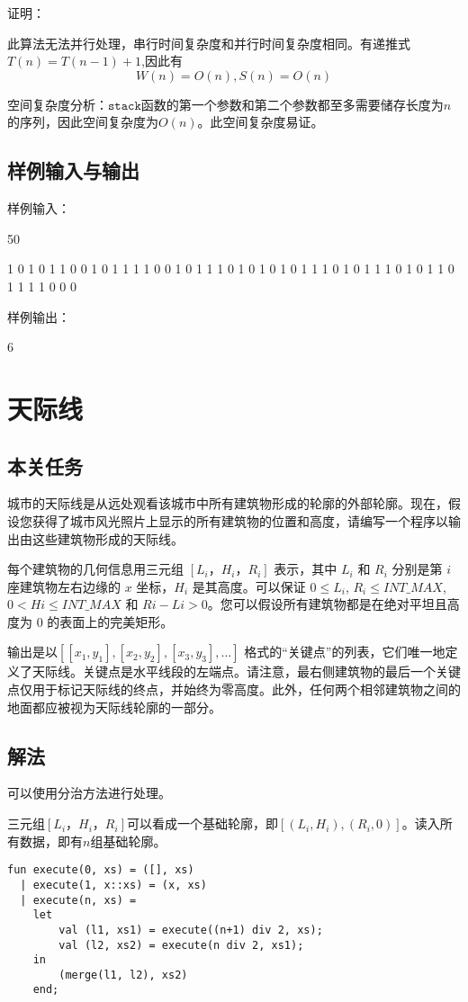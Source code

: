 \documentclass[UTF8,a4paperdui, %
]{ctexart}
\begin{document}
证明：

此算法无法并行处理，串行时间复杂度和并行时间复杂度相同。有递推式$T(n)=T(n-1)+1$,因此有
\[
	W(n)=O(n),S(n)=O(n)
\]

空间复杂度分析：$\texttt{stack}$函数的第一个参数和第二个参数都至多需要储存长度为$n$的序列，因此空间复杂度为$O(n)$。此空间复杂度易证。

\subsection{样例输入与输出}
样例输入：

50 

1 0 1 0 1 1 0 0 1 0 1 1 1 1 0 0 1 0 1 1 1 0 1 0 1 0 1 0 1 1 1 0 1 0 1 1 1 0 1 0 1 1 0 1 1 1 1 0 0 0

样例输出：

6
\section{天际线}
\subsection{本关任务}
城市的天际线是从远处观看该城市中所有建筑物形成的轮廓的外部轮廓。现在，假设您获得了城市风光照片上显示的所有建筑物的位置和高度，请编写一个程序以输出由这些建筑物形成的天际线。

每个建筑物的几何信息用三元组 $[L_i，H_i，R_i]$ 表示，其中 $L_i$ 和 $R_i$ 分别是第 $i$ 座建筑物左右边缘的 $x$ 坐标，$H_i$ 是其高度。可以保证 $0 \leq L_i$, $R_i \leq INT\_MAX$, $0 < Hi \leq INT\_MAX$ 和 $Ri - Li > 0$。您可以假设所有建筑物都是在绝对平坦且高度为 0 的表面上的完美矩形。

输出是以$[[x_1,y_1],[x_2, y_2],[x_3, y_3], ... ]$ 格式的“关键点”的列表，它们唯一地定义了天际线。关键点是水平线段的左端点。请注意，最右侧建筑物的最后一个关键点仅用于标记天际线的终点，并始终为零高度。此外，任何两个相邻建筑物之间的地面都应被视为天际线轮廓的一部分。
\subsection{解法}
可以使用分治方法进行处理。

三元组$[L_i，H_i，R_i]$可以看成一个基础轮廓，即$[(L_i, H_i), (R_i, 0)]$。读入所有数据，即有$n$组基础轮廓。

\begin{lstlisting}
fun execute(0, xs) = ([], xs)
  | execute(1, x::xs) = (x, xs)
  | execute(n, xs) = 
    let
        val (l1, xs1) = execute((n+1) div 2, xs);
        val (l2, xs2) = execute(n div 2, xs1);
    in
        (merge(l1, l2), xs2)
    end;
\end{lstlisting}
\end{document}
